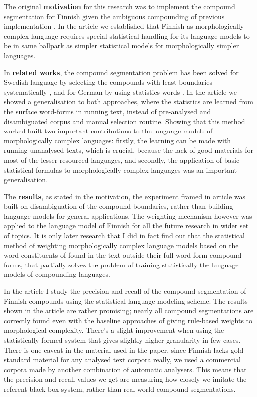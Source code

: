\documentclass[officiallayout,draft]{unihelcompling}
\begin{document}
The original \textbf{motivation} for this research was to implement the
compound segmentation for Finnish given the ambiguous compounding of previous
implementation \cite{pirinen2008}. In the article we established that Finnish
as morphologically complex language requires special statistical handling for
its language models to be in same ballpark as simpler statistical models for
morphologically simpler languages.

In \textbf{related works}, the compound segmentation problem has been solved
for Swedish language by selecting the compounds with least boundaries
systematically \cite{karlsson}, and for German by using statistics words
\cite{schiller}. In the article we showed a generalisation to both approaches,
where the statistics are learned from the surface word-forms in running text,
instead of pre-analysed and disambiguated corpus and manual selection routine.
Showing that this method worked built two important contributions to the
language models of morphologically complex languages: firstly, the learning
can be made with running unanalysed texts, which is crucial, because the
lack of good materials for most of the lesser-resourced languages, and 
secondly, the application of basic statistical formulas to morphologically
complex languages was an important generalisation.

The \textbf{results}, as stated in the motivation, the experiment framed in
article was built on disambiguation of the compound boundaries, rather than
building language models for general applications. The weighting mechanism
however was applied to the language model of Finnish for all the future
research in wider set of topics. It is only later research that I did in fact
find out that the statistical method of weighting morphologically complex
language models based on the word constituents of found in the text outside
their full word form compound forms, that partially solves the problem of
training statistically the language models of compounding languages.

In the article I study the precision and recall of the compound segmentation
of Finnish compounds using the statistical language modeling scheme. The
results shown in the article are rather promising; nearly all compound
segmentations are correctly found even with the baseline approaches of giving
rule-based weights to morphological complexity. There's a slight improvement
when using the statistically formed system that gives slightly higher
granularity in few cases. There is one caveat in the material used in the
paper, since Finnish lacks gold standard material for any analysed text
corpora really, we used a commercial corpora made by another combination
of automatic analysers. This means that the precision and recall values we
get are measuring how closely we imitate the referent black box system, rather
than real world compound segmentations.
\end{document}
